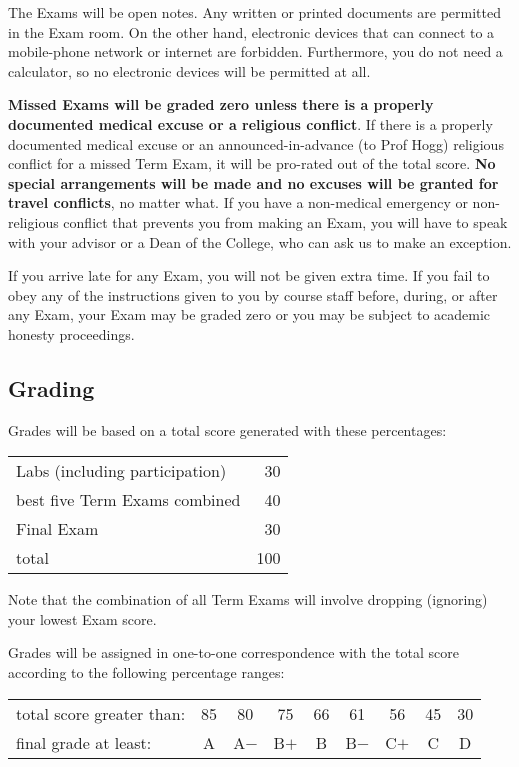 \documentclass[12pt]{article}
\begin{document}
The Exams will be open notes. Any written or printed documents are
permitted in the Exam room. On the other hand, electronic devices that
can connect to a mobile-phone network or internet are
forbidden. Furthermore, you do not need a calculator, so no electronic
devices will be permitted at all.

\textbf{Missed Exams will be graded zero unless there is a properly
  documented medical excuse or a religious conflict}. If there is a
properly documented medical excuse or an announced-in-advance (to Prof
Hogg) religious conflict for a missed Term Exam, it will be pro-rated
out of the total score. \textbf{No special arrangements will be made
  and no excuses will be granted for travel conflicts}, no matter
what. If you have a non-medical emergency or non-religious conflict
that prevents you from making an Exam, you will have to speak with your
advisor or a Dean of the College, who can ask us to make an exception.

If you arrive late for any Exam, you will not be given extra time. If
you fail to obey any of the instructions given to you by course staff
before, during, or after any Exam, your Exam may be graded zero or you
may be subject to academic honesty proceedings.

\subsection*{Grading}

Grades will be based on a total score generated with these percentages:

\bigskip\noindent
\begin{tabular}{lr}
\hline
Labs (including participation) &  30 \\
best five Term Exams combined  &  40 \\
Final Exam                     &  30 \\
\hline
total                          & 100 \\
\hline
\end{tabular}

\bigskip\noindent
Note that the combination of all Term Exams will involve dropping
(ignoring) your lowest Exam score.

Grades will be assigned in one-to-one correspondence with the total
score according to the following percentage ranges:

\bigskip\noindent
\begin{tabular}{lcccccccc}
\hline
total score greater than: & 85 & 80   & 75   & 66 & 61   & 56   & 45 & 30 \\
final grade at least:     & A  & A$-$ & B$+$ & B  & B$-$ & C$+$ & C  & D  \\
\hline
\end{tabular}
\end{document}

